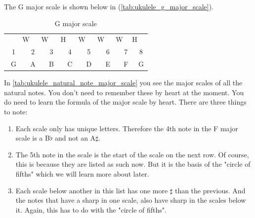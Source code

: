 The G major scale is shown below in (\autoref{tab:ukulele_g_major_scale}).

\begin{table}[h]
	\centering
	\begin{tabular}{*{16}{c}}
		& \multicolumn{2}{P{4mm}}{\large{W}} & \multicolumn{2}{P{4mm}}{\large{W}} & \multicolumn{2}{P{4mm}}{\large{H}} & \multicolumn{2}{P{4mm}}{\large{W}} & \multicolumn{2}{P{4mm}}{\large{W}} & \multicolumn{2}{P{4mm}}{\large{W}} & \multicolumn{2}{P{4mm}}{\large{H}} & \\
		\multicolumn{2}{P{4mm}}{1} & \multicolumn{2}{P{4mm}}{2} & \multicolumn{2}{P{4mm}}{3} & \multicolumn{2}{P{4mm}}{4} & \multicolumn{2}{P{4mm}}{5} & \multicolumn{2}{P{4mm}}{6} & \multicolumn{2}{P{4mm}}{7} & \multicolumn{2}{P{4mm}}{8} \\
		\multicolumn{2}{P{4mm}}{G} & \multicolumn{2}{P{4mm}}{A} & \multicolumn{2}{P{4mm}}{B} & \multicolumn{2}{P{4mm}}{C} & \multicolumn{2}{P{4mm}}{D} & \multicolumn{2}{P{4mm}}{E} & \multicolumn{2}{P{4mm}}{F\sharp} & \multicolumn{2}{P{4mm}}{G}
	\end{tabular}
	\caption{G major scale}
	\label{tab:ukulele_g_major_scale}
\end{table}

In \autoref{tab:ukulele_natural_note_major_scale} you see the major scales of all the natural notes. You don't need to remember these by heart at the moment. You do need to learn the formula of the major scale by heart. There are three things to note:

\begin{enumerate}
	\item Each scale only has unique letters. Therefore the 4th note in the F major scale is a B$\flat$ and not an A$\sharp$.
	\item The 5th note in the scale is the start of the scale on the next row. Of course, this is because they are listed as such now. But it is the basis of the "circle of fifths" which we will learn more about later.
	\item Each scale below another in this list has one more $\sharp$ than the previous. And the notes that have a sharp in one scale, also have sharp in the scales below it. Again, this has to do with the "circle of fifths".
\end{enumerate}

